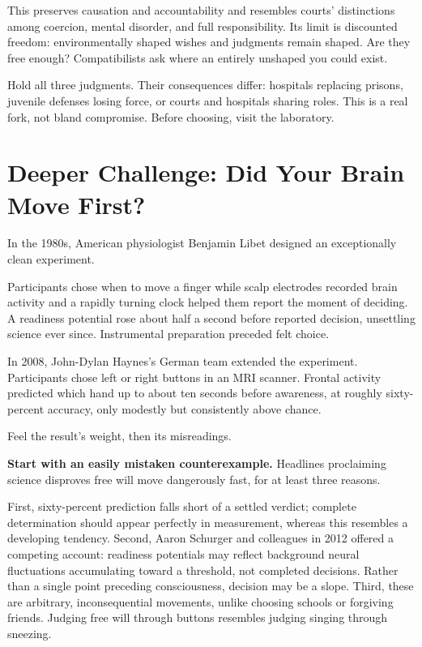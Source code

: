 This preserves causation and accountability and resembles courts' distinctions among coercion, mental disorder, and full responsibility. Its limit is discounted freedom: environmentally shaped wishes and judgments remain shaped. Are they free enough? Compatibilists ask where an entirely unshaped you could exist.

Hold all three judgments. Their consequences differ: hospitals replacing prisons, juvenile defenses losing force, or courts and hospitals sharing roles. This is a real fork, not bland compromise. Before choosing, visit the laboratory.

\section[Did Your Brain Move First?]{Deeper Challenge: Did Your Brain Move First?}
In the 1980s, American physiologist Benjamin Libet designed an exceptionally clean experiment.

Participants chose when to move a finger while scalp electrodes recorded brain activity and a rapidly turning clock helped them report the moment of deciding. A readiness potential rose about half a second before reported decision, unsettling science ever since. Instrumental preparation preceded felt choice.

In 2008, John-Dylan Haynes's German team extended the experiment. Participants chose left or right buttons in an MRI scanner. Frontal activity predicted which hand up to about ten seconds before awareness, at roughly sixty-percent accuracy, only modestly but consistently above chance.

Feel the result's weight, then its misreadings.

\textbf{Start with an easily mistaken counterexample.} Headlines proclaiming science disproves free will move dangerously fast, for at least three reasons.

First, sixty-percent prediction falls short of a settled verdict; complete determination should appear perfectly in measurement, whereas this resembles a developing tendency. Second, Aaron Schurger and colleagues in 2012 offered a competing account: readiness potentials may reflect background neural fluctuations accumulating toward a threshold, not completed decisions. Rather than a single point preceding consciousness, decision may be a slope. Third, these are arbitrary, inconsequential movements, unlike choosing schools or forgiving friends. Judging free will through buttons resembles judging singing through sneezing.


